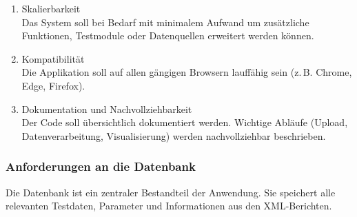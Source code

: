 \begin{enumerate}
  \item Skalierbarkeit \\
  Das System soll bei Bedarf mit minimalem Aufwand um zusätzliche Funktionen, Testmodule oder Datenquellen erweitert werden können.

  \item Kompatibilität \\
  Die Applikation soll auf allen gängigen Browsern lauffähig sein (z.\,B. Chrome, Edge, Firefox).

  \item Dokumentation und Nachvollziehbarkeit \\
  Der Code soll übersichtlich dokumentiert werden.
  Wichtige Abläufe (Upload, Datenverarbeitung, Visualisierung) werden nachvollziehbar beschrieben.
\end{enumerate}

\subsubsection{Anforderungen an die Datenbank}
\label{subsec:anforderungen-an-die-datenbank}

Die Datenbank ist ein zentraler Bestandteil der Anwendung.
Sie speichert alle relevanten Testdaten, Parameter und Informationen aus den XML-Berichten.

